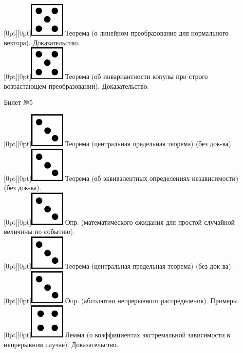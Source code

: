 \documentclass[10pt]{article}
\begin{document}
\raisebox{-1pt}[0pt][0pt]{\includegraphics[width=0.02\linewidth]{5.png}} Теорема (о линейном преобразование для нормального вектора). Доказательство. \\

\raisebox{-1pt}[0pt][0pt]{\includegraphics[width=0.02\linewidth]{5.png}} Теорема (об инвариантности копулы при строго возрастающем преобразовании). Доказательство. \\

\begin{center} {\Large Билет №5} \end{center} 

\raisebox{-1pt}[0pt][0pt]{\includegraphics[width=0.02\linewidth]{3.png}} Теорема (центральная предельная теорема) (без док-ва). \\

\raisebox{-1pt}[0pt][0pt]{\includegraphics[width=0.02\linewidth]{3.png}} Теорема (об эквивалентных определениях независимости) (без док-ва). \\

\raisebox{-1pt}[0pt][0pt]{\includegraphics[width=0.02\linewidth]{3.png}} Опр. (математического ожидания для простой случайной величины по событию). \\

\raisebox{-1pt}[0pt][0pt]{\includegraphics[width=0.02\linewidth]{3.png}} Теорема (центральная предельная теорема) (без док-ва). \\

\raisebox{-1pt}[0pt][0pt]{\includegraphics[width=0.02\linewidth]{3.png}} Опр. (абсолютно непрерывного распределения). Примеры. \\

\raisebox{-1pt}[0pt][0pt]{\includegraphics[width=0.02\linewidth]{4.png}} Лемма (о коэффициентах экстремальной зависимости в непрерывном случае). Доказательство. \\
\end{document}
